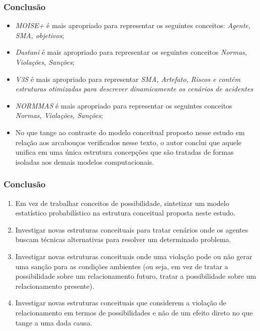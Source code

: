 \documentclass{beamer}
\begin{document}
\begin{frame}
	\frametitle{Conclusão}
	\begin{itemize}
		\item \textit{MOISE+} é mais apropriado para representar os seguintes conceitos: \textit{Agente, SMA, objetivos};
		\item \textit{Dastani} é mais apropriado para representar os seguintes conceitos \textit{Normas, Violações, Sanções};
		\item \textit{V3S} é mais apropriado para representar \textit{SMA, Artefato, Riscos e contém estruturas otimizadas para descrever dinamicamente os cenários de acidentes}
		\item \textit{NORMMAS} é mais apropriado para representar os seguintes conceitos \textit{Normas, Violações, Sanções};
		\item No que tange ao contraste do modelo conceitual proposto nesse estudo em relação aos arcabouços verificados nesse texto, o autor conclui que aquele unifica em uma única estrutura concepções que são tratadas de formas isoladas aos demais modelos computacionais.
	\end{itemize}
\end{frame}

\begin{frame}
	\frametitle{Conclusão}
	\begin{enumerate}
		\item Em vez de trabalhar conceitos de possibilidade, sintetizar um modelo estatístico probabilístico na estrutura conceitual proposta neste estudo.
		\item Investigar novas estruturas conceituais para tratar cenários onde os agentes buscam técnicas alternativas para resolver um determinado problema. 
		\item Investigar novas estruturas conceituais onde uma violação pode ou não gerar uma sanção para as condições ambientes (ou seja, em vez de tratar a possibilidade sobre um relacionamento futuro, tratar a possibilidade sobre um relacionamento presente).
		\item Investigar novas estruturas conceituais que considerem a violação de relacionamento em termos de possibilidades e não de um efeito direto no que tange a uma dada causa.   
	\end{enumerate}
\end{frame}
\end{document}
